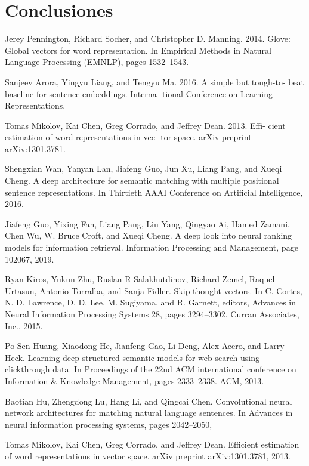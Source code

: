 \documentclass{llncs}
\begin{document}
\section{Conclusiones}
     


%
%
\begin{thebibliography}{}
%
 Jerey Pennington, Richard Socher, and Christopher D. Manning. 2014. Glove: Global vectors for word representation. In Empirical Methods in Natural Language Processing (EMNLP), pages 1532–1543.

 Sanjeev Arora, Yingyu Liang, and Tengyu Ma. 2016. A simple but tough-to- beat baseline for sentence embeddings. Interna- tional Conference on Learning Representations.

 Tomas Mikolov, Kai Chen, Greg Corrado, and Jeffrey Dean. 2013. Effi- cient estimation of word representations in vec- tor space. arXiv preprint arXiv:1301.3781.

Shengxian Wan, Yanyan Lan, Jiafeng Guo, Jun Xu, Liang Pang, and Xueqi Cheng. A deep architecture for semantic matching with multiple positional sentence representations. In Thirtieth AAAI Conference on Artificial Intelligence, 2016.

 Jiafeng Guo, Yixing Fan, Liang Pang, Liu Yang, Qingyao Ai, Hamed Zamani, Chen Wu, W. Bruce Croft, and Xueqi Cheng. A deep look into neural ranking models for information retrieval. Information Processing and Management, page 102067, 2019.

 Ryan Kiros, Yukun Zhu, Ruslan R Salakhutdinov, Richard Zemel, Raquel Urtasun, Antonio Torralba, and Sanja Fidler. Skip-thought vectors. In C. Cortes, N. D. Lawrence, D. D. Lee, M. Sugiyama, and R. Garnett, editors, Advances in Neural Information Processing Systems 28, pages 3294–3302. Curran Associates, Inc., 2015.

 Po-Sen Huang, Xiaodong He, Jianfeng Gao, Li Deng, Alex Acero, and Larry Heck. Learning deep structured semantic models for web search using clickthrough data. In Proceedings of the 22nd ACM international conference on Information \& Knowledge Management, pages 2333–2338. ACM, 2013.

 Baotian Hu, Zhengdong Lu, Hang Li, and Qingcai Chen. Convolutional neural network architectures for matching natural language sentences. In Advances in neural information processing systems, pages 2042–2050,


  Tomas Mikolov, Kai Chen, Greg Corrado, and Jeffrey Dean. Efficient estimation of word representations in vector space. arXiv preprint arXiv:1301.3781, 2013.


\end{thebibliography}
\end{document}
